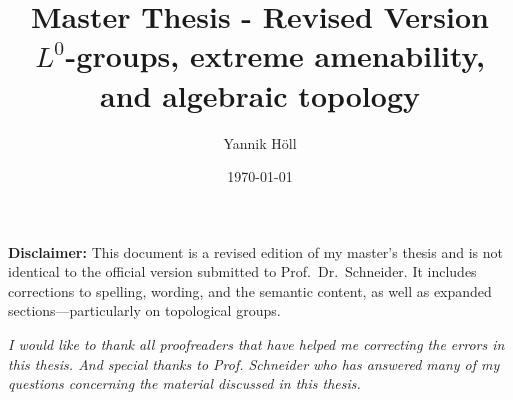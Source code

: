 \documentclass[a4paper, 12pt, twoside]{article}
\title{Master Thesis - Revised Version\\{$L^0$-groups, extreme amenability, and algebraic topology}}
\author{Yannik Höll}
\date{\today}
\theoremstyle{break}
\theoremstyle{break}
\begin{document}
\begin{titlingpage}
    \maketitle
\end{titlingpage}
\clearpage

\vspace*{\fill}
\begin{center}
\textbf{Disclaimer:} This document is a revised edition of my master’s thesis and is not identical to the official version submitted to Prof.\ Dr.\ Schneider. It includes corrections to spelling, wording, and the semantic content, as well as expanded sections—particularly on topological groups.
\end{center}
\vspace*{\fill}
\thispagestyle{empty}

\clearpage
\vspace*{\fill}
\begin{center}
\textit{
    I would like to thank all proofreaders that have helped me correcting the errors in this thesis. 
    And special thanks to Prof. Schneider who has answered many of my questions concerning the material discussed in this thesis.  
}
\end{center}
\vspace*{\fill}
\thispagestyle{empty}
\clearpage

\tableofcontents
\clearpage

\printnomenclature
\pagebreak

\nocite{*}


\pagebreak

\pagebreak

\pagebreak

\pagebreak

\pagebreak

\appendix
\pagebreak

\clearpage
\printbibliography
\end{document}
